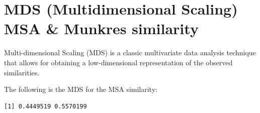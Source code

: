 \documentclass[
  letterpaper,
  DIV=11,
  numbers=noendperiod]{scrreprt}
\newenvironment{Shaded}{}{}
\newcommand{\AttributeTok}[1]{\textcolor[rgb]{0.78,0.47,0.87}{#1}}
\newcommand{\CommentTok}[1]{\textcolor[rgb]{0.36,0.39,0.44}{\textit{#1}}}
\newcommand{\ConstantTok}[1]{\textcolor[rgb]{0.82,0.60,0.40}{#1}}
\newcommand{\DecValTok}[1]{\textcolor[rgb]{0.82,0.60,0.40}{#1}}
\newcommand{\DocumentationTok}[1]{\textcolor[rgb]{0.64,0.20,0.25}{#1}}
\newcommand{\FunctionTok}[1]{\textcolor[rgb]{0.38,0.69,0.94}{#1}}
\newcommand{\NormalTok}[1]{\textcolor[rgb]{0.67,0.70,0.75}{#1}}
\newcommand{\OtherTok}[1]{\textcolor[rgb]{0.15,0.68,0.38}{#1}}
\newcommand{\SpecialCharTok}[1]{\textcolor[rgb]{0.34,0.71,0.76}{#1}}
\begin{document}
\hypertarget{mds-multidimensional-scaling-msa-munkres-similarity}{%
\section{MDS (Multidimensional Scaling) MSA \& Munkres
similarity}\label{mds-multidimensional-scaling-msa-munkres-similarity}}

Multi-dimensional Scaling (MDS) is a classic multivariate data analysis
technique that allows for obtaining a low-dimensional representation of
the observed similarities.

The following is the MDS for the MSA similarity:

\begin{Shaded}
\end{Shaded}

\begin{verbatim}
[1] 0.4449519 0.5570199
\end{verbatim}
\end{document}
